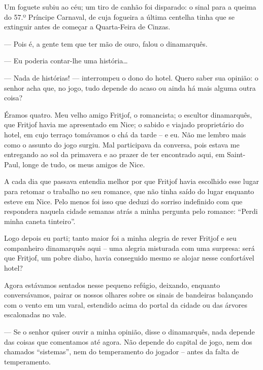 Um foguete subiu ao céu; um tiro de canhão foi disparado: o sinal para a
queima do 57.º Príncipe Carnaval, de cuja fogueira a última centelha
tinha que se extinguir antes de começar a Quarta-Feira de Cinzas.


--- Pois é, a gente tem que ter mão de ouro, falou o dinamarquês.

--- Eu poderia contar-lhe uma história\ldots{}

--- Nada de histórias! --- interrompeu o dono do hotel. Quero saber sua
opinião: o senhor acha que, no jogo, tudo depende do acaso ou ainda há
mais alguma outra coisa?

Éramos quatro. Meu velho amigo Fritjof, o romancista; o escultor
dinamarquês, que Fritjof havia me apresentado em Nice; o sabido e
viajado proprietário do hotel, em cujo terraço tomávamos o chá da tarde
-- e eu. Não me lembro mais como o assunto do jogo surgiu. Mal
participava da conversa, pois estava me entregando ao sol da primavera e
ao prazer de ter encontrado aqui, em Saint-Paul, longe de tudo, os meus
amigos de Nice.

A cada dia que passava entendia melhor por que Fritjof havia escolhido
esse lugar para retomar o trabalho no seu romance, que não tinha saído
do lugar enquanto esteve em Nice. Pelo menos foi isso que deduzi do
sorriso indefinido com que respondera naquela cidade semanas atrás a
minha pergunta pelo romance: ``Perdi minha caneta tinteiro''.

Logo depois eu parti; tanto maior foi a minha alegria de rever Fritjof e
seu companheiro dinamarquês aqui -- uma alegria misturada com uma
surpresa: será que Fritjof, um pobre diabo, havia conseguido mesmo se
alojar nesse confortável hotel?

Agora estávamos sentados nesse pequeno refúgio, deixando, enquanto
conversávamos, pairar os nossos olhares sobre os sinais de bandeiras
balançando com o vento em um varal, estendido acima do portal da cidade
ou das árvores escalonadas no vale.

--- Se o senhor quiser ouvir a minha opinião, disse o dinamarquês, nada
depende das coisas que comentamos até agora. Não depende do capital de
jogo, nem dos chamados ``sistemas'', nem do temperamento do jogador --
antes da falta de temperamento.

